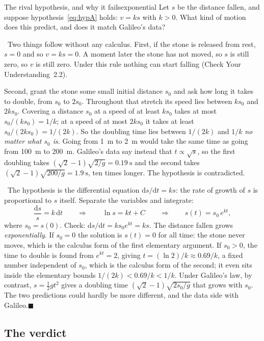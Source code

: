 \documentclass[11pt,twoside,openany]{book}
\newcommand{\dd}{\mathrm{d}}
\newcommand{\viewtag}[3]{\fcolorbox{#2}{#3}{\footnotesize\textbf{\textcolor{#2}{#1}}}}
\newcommand{\elemtag}{\viewtag{Elementary}{elemcol}{elempale}}
\newcommand{\calctag}{\viewtag{Calculus}{calccol}{calcpale}}
\newcommand{\elem}{\par\medskip\noindent\elemtag\ }
\newcommand{\calc}{\par\medskip\noindent\calctag\ }
\newcommand{\qed}{\hfill$\blacksquare$}
\begin{document}
\begin{example}{The rival hypothesis, and why it fails}{exponential}
Let $s$ be the distance fallen, and suppose hypothesis~\eqref{eq:hypA} holds: $v = ks$ with $k > 0$. What kind of motion does this predict, and does it match Galileo's data?

\elem Two things follow without any calculus. First, if the stone is released from rest, $s = 0$ and so $v = ks = 0$. A moment later the stone has not moved, so $s$ is still zero, so $v$ is still zero. Under this rule nothing can start falling (Check Your Understanding~2.2).

Second, grant the stone some small initial distance $s_0$ and ask how long it takes to double, from $s_0$ to $2s_0$. Throughout that stretch its speed lies between $ks_0$ and $2ks_0$. Covering a distance $s_0$ at a speed of at least $ks_0$ takes at most $s_0/(ks_0) = 1/k$; at a speed of at most $2ks_0$ it takes at least $s_0/(2ks_0) = 1/(2k)$. So the doubling time lies between $1/(2k)$ and $1/k$ \emph{no matter what $s_0$ is}. Going from \SI{1}{\metre} to \SI{2}{\metre} would take the same time as going from \SI{100}{\metre} to \SI{200}{\metre}. Galileo's data say instead that $t \propto \sqrt{s}$, so the first doubling takes $(\sqrt2 - 1)\sqrt{2/g} = \SI{0.19}{\second}$ and the second takes $(\sqrt2 - 1)\sqrt{200/g} = \SI{1.9}{\second}$, ten times longer. The hypothesis is contradicted.

\calc The hypothesis is the differential equation $\dd s/\dd t = k s$: the rate of growth of $s$ is proportional to $s$ itself. Separate the variables and integrate:
\[
\frac{\dd s}{s} = k\,\dd t \qquad\Longrightarrow\qquad \ln s = k t + C \qquad\Longrightarrow\qquad s(t) = s_0\, e^{k t},
\]
where $s_0 = s(0)$. Check: $\dd s/\dd t = k s_0 e^{kt} = k s$. The distance fallen grows \emph{exponentially}. If $s_0 = 0$ the solution is $s(t) = 0$ for all time: the stone never moves, which is the calculus form of the first elementary argument. If $s_0 > 0$, the time to double is found from $e^{kt} = 2$, giving $t = (\ln 2)/k \approx 0.69/k$, a fixed number independent of $s_0$, which is the calculus form of the second; it even sits inside the elementary bounds $1/(2k) < 0.69/k < 1/k$. Under Galileo's law, by contrast, $s = \tfrac12 g t^2$ gives a doubling time $(\sqrt2 - 1)\sqrt{2s_0/g}$ that grows with $s_0$. The two predictions could hardly be more different, and the data side with Galileo.\qed
\end{example}

\subsection{The verdict}
\end{document}
